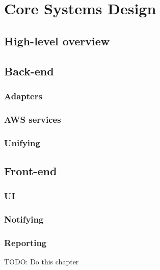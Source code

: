 \chapter{Core Systems Design}
\label{cha:core_system_design}
\section{High-level overview}
\section{Back-end}
\subsection{Adapters}
\subsection{AWS services}
\subsection{Unifying}
\section{Front-end}
\subsection{UI}
\subsection{Notifying}
\subsection{Reporting}

TODO: Do this chapter
